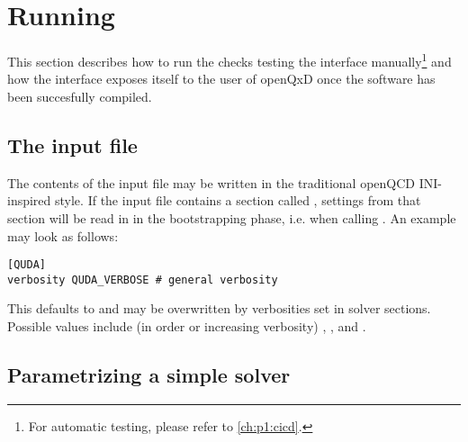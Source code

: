 \chapter{Running}
\label{ch:p1:running}

This section describes how to run the checks testing the interface manually\footnote{For automatic testing, please refer to \cref{ch:p1:cicd}.} and how the interface exposes itself to the user of openQxD once the software has been succesfully compiled.

\section{The input file}
\label{sec:running:infile}

The contents of the input file may be written in the traditional openQCD INI-inspired style. If the input file contains a section called , settings from that section will be read in in the bootstrapping phase, i.e. when calling . An example may look as follows:
\begin{verbatim}
[QUDA]
verbosity QUDA_VERBOSE # general verbosity
\end{verbatim}
This defaults to  and may be overwritten by verbosities set in solver sections. Possible values include (in order or increasing verbosity) , ,  and .

\section{Parametrizing a simple solver}
\label{sec:running:solver}

